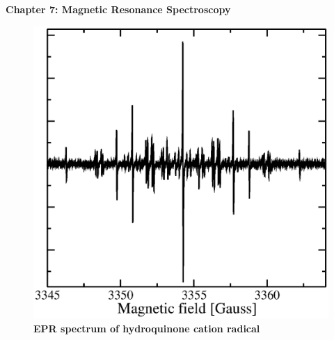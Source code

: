 \renewcommand{\theequation}{7.\arabic{equation}}

\begin{frame}
\begin{center}
{\bf Chapter 7: Magnetic Resonance Spectroscopy}\\
\end{center}

\vspace*{0.3cm}

\begin{figure}
\centering
\includegraphics[scale=0.3]{figs/quinone}\\
\hspace{0.8cm}\textbf{\tiny{EPR spectrum of hydroquinone cation radical}}
\end{figure}
\end{frame}

\scriptsize






